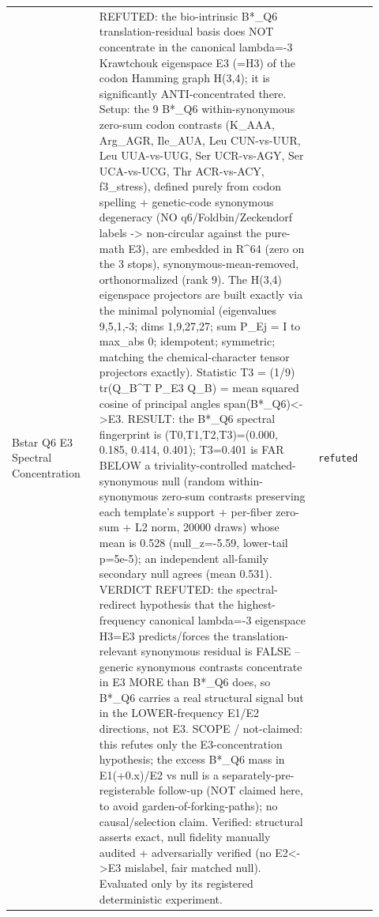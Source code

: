 \begin{longtable}{>{\raggedright\arraybackslash}p{0.22\linewidth}>{\raggedright\arraybackslash}p{0.55\linewidth}>{\raggedright\arraybackslash}p{0.15\linewidth}}
Bstar Q6 E3 Spectral Concentration & REFUTED: the bio-intrinsic B*\_Q6 translation-residual basis does NOT concentrate in the canonical lambda=-3 Krawtchouk eigenspace E3 (=H3) of the codon Hamming graph H(3,4); it is significantly ANTI-concentrated there. Setup: the 9 B*\_Q6 within-synonymous zero-sum codon contrasts (K\_AAA, Arg\_AGR, Ile\_AUA, Leu CUN-vs-UUR, Leu UUA-vs-UUG, Ser UCR-vs-AGY, Ser UCA-vs-UCG, Thr ACR-vs-ACY, f3\_stress), defined purely from codon spelling + genetic-code synonymous degeneracy (NO q6/Foldbin/Zeckendorf labels -> non-circular against the pure-math E3), are embedded in R\textasciicircum{}64 (zero on the 3 stops), synonymous-mean-removed, orthonormalized (rank 9). The H(3,4) eigenspace projectors are built exactly via the minimal polynomial (eigenvalues 9,5,1,-3; dims 1,9,27,27; sum P\_Ej = I to max\_abs 0; idempotent; symmetric; matching the chemical-character tensor projectors exactly). Statistic T3 = (1/9) tr(Q\_B\textasciicircum{}T P\_E3 Q\_B) = mean squared cosine of principal angles span(B*\_Q6)<->E3. RESULT: the B*\_Q6 spectral fingerprint is (T0,T1,T2,T3)=(0.000, 0.185, 0.414, 0.401); T3=0.401 is FAR BELOW a triviality-controlled matched-synonymous null (random within-synonymous zero-sum contrasts preserving each template's support + per-fiber zero-sum + L2 norm, 20000 draws) whose mean is 0.528 (null\_z=-5.59, lower-tail p=5e-5); an independent all-family secondary null agrees (mean 0.531). VERDICT REFUTED: the spectral-redirect hypothesis that the highest-frequency canonical lambda=-3 eigenspace H3=E3 predicts/forces the translation-relevant synonymous residual is FALSE -- generic synonymous contrasts concentrate in E3 MORE than B*\_Q6 does, so B*\_Q6 carries a real structural signal but in the LOWER-frequency E1/E2 directions, not E3. SCOPE / not-claimed: this refutes only the E3-concentration hypothesis; the excess B*\_Q6 mass in E1(+0.x)/E2 vs null is a separately-pre-registerable follow-up (NOT claimed here, to avoid garden-of-forking-paths); no causal/selection claim. Verified: structural asserts exact, null fidelity manually audited + adversarially verified (no E2<->E3 mislabel, fair matched null). Evaluated only by its registered deterministic experiment. & \texttt{refuted} \\

\end{longtable}
